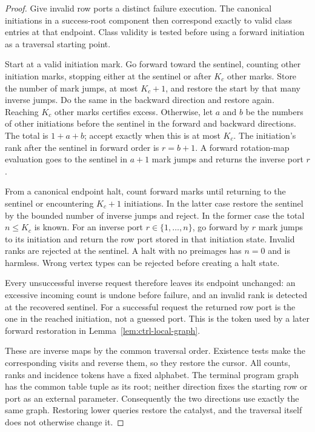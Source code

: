 \begin{proof}
Give invalid row ports a distinct failure execution.  The canonical
initiations in a success-root component then correspond exactly to
valid class entries at that endpoint.  Class validity is tested before
using a forward initiation as a traversal starting point.

Start at a valid initiation mark.  Go forward toward the sentinel,
counting other initiation marks, stopping either at the sentinel or
after $K_c$ other marks.  Store the number of mark jumps, at most
$K_c+1$, and restore the start by that many inverse jumps.  Do the same
in the backward direction and restore again.  Reaching $K_c$ other
marks certifies excess.  Otherwise, let $a$ and $b$ be the numbers of
other initiations before the sentinel in the forward and backward
directions.  The total is $1+a+b$; accept exactly when this is at most
$K_c$.  The initiation's rank after the sentinel in forward order is
$r=b+1$.  A forward rotation-map evaluation goes to the sentinel in $a+1$ mark
jumps and returns the inverse port $r$.

From a canonical endpoint halt, count forward marks until returning to
the sentinel or encountering $K_c+1$ initiations.  In the latter case
restore the sentinel by the bounded number of inverse jumps and
reject.  In the former case the total $n\le K_c$ is known.  For an
inverse port $r\in\{1,\ldots,n\}$, go forward by $r$ mark jumps to its
initiation and return the row port stored in that initiation state.
Invalid ranks are rejected at the sentinel.  A halt with no preimages
has $n=0$ and is harmless.  Wrong vertex types can be rejected before
creating a halt state.

Every unsuccessful inverse request therefore leaves its endpoint
unchanged: an excessive incoming count is undone before failure, and an
invalid rank is detected at the recovered sentinel.  For a successful
request the returned row port is the one in the reached initiation,
not a guessed port.  This is the token used by a later forward
restoration in Lemma~\ref{lem:ctrl-local-graph}.

These are inverse maps by the common traversal order.  Existence tests
make the corresponding visits and reverse them, so they restore the
cursor.  All counts, ranks and incidence tokens have a fixed alphabet.
The terminal program graph has the common table tuple as its root;
neither direction fixes the starting row or port as an external
parameter.  Consequently the two directions use exactly the same
graph.  Restoring lower queries restore the catalyst, and the traversal
itself does not otherwise change it.
\end{proof}

